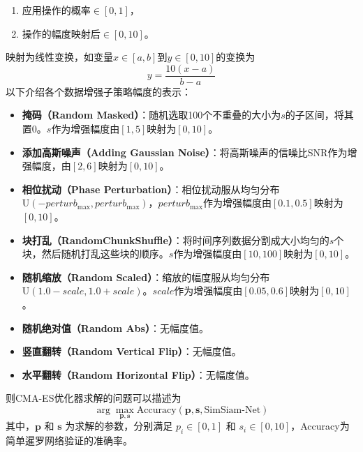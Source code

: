 \documentclass[master]{thesis-uestc}
\begin{document}
\begin{enumerate}[label={(\arabic*)}]
    \item 应用操作的概率\(\in [0,1]\)，
    \item 操作的幅度映射后\(\in [0,10]\)。
\end{enumerate}
映射为线性变换，如变量\(x \in [a,b]\)到\(y \in [0,10]\)的变换为
\begin{equation}
    y = \frac{10(x - a)}{b - a}
    \end{equation}
以下介绍各个数据增强子策略幅度的表示：
\begin{itemize}
    \item \textbf{掩码（Random Masked）}：随机选取100个不重叠的大小为$s$的子区间，将其置0。$s$作为增强幅度由\([1,5]\)映射为\([0,10]\)。

    \item \textbf{添加高斯噪声（Adding Gaussian Noise）}：将高斯噪声的信噪比SNR作为增强幅度，由\([2,6]\)映射为\([0,10]\)。

    \item \textbf{相位扰动（Phase Perturbation）}：相位扰动服从均匀分布$\text{U}(-perturb_{\text{max}}, perturb_{\text{max}})$，$perturb_{\text{max}}$作为增强幅度由\([0.1,0.5]\)映射为\([0,10]\)。

    \item \textbf{块打乱（RandomChunkShuffle）}：将时间序列数据分割成大小均匀的$s$个块，然后随机打乱这些块的顺序。$s$作为增强幅度由\([10,100]\)映射为\([0,10]\)。

    \item \textbf{随机缩放（Random Scaled）}：缩放的幅度服从均匀分布$\text{U}(1.0-scale, 1.0+scale)$。$scale$作为增强幅度由\([0.05,0.6]\)映射为\([0,10]\)。

    \item \textbf{随机绝对值（Random Abs）}：无幅度值。

    \item \textbf{竖直翻转（Random Vertical Flip）}：无幅度值。

    \item \textbf{水平翻转（Random Horizontal Flip）}：无幅度值。
    
\end{itemize}
则CMA-ES优化器求解的问题可以描述为 
\begin{equation}
    \arg\max_{\mathbf{p}, \mathbf{s}} \text{Accuracy}(\mathbf{p}, \mathbf{s}, \text{SimSiam-Net})
\end{equation}
其中，\(\mathbf{p}\) 和 \(\mathbf{s}\) 为求解的参数，分别满足 \(p_i \in [0, 1]\) 和 \(s_i \in [0, 10]\)，Accuracy为简单暹罗网络验证的准确率。
\end{document}
